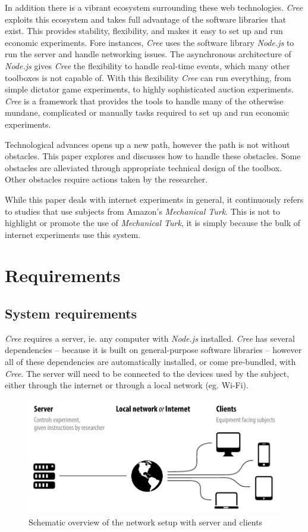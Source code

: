 \documentclass[preprint, 12pt]{elsarticle}
\newcommand{\Cree}{\emph{Cree}\xspace}
\begin{document}
In addition there is a vibrant ecosystem surrounding these web technologies. \Cree exploits this ecosystem and takes full advantage of the software libraries that exist. This provides stability, flexibility, and makes it easy to set up and run economic experiments. Fore instances, \Cree uses the software library \emph{Node.js} to run the server and handle networking issues. The asynchronous architecture of \emph{Node.js} gives \Cree the flexibility to handle real-time events, which many other toolboxes is not capable of. With this flexibility \Cree can run everything, from simple dictator game experiments, to highly sophisticated auction experiments. \Cree is a framework that provides the tools to handle many of the otherwise mundane, complicated or manually tasks required to set up and run economic experiments.

Technological advances opens up a new path, however the path is not without obstacles. This paper explores and discusses how to handle these obstacles. Some obstacles are alleviated through appropriate technical design of the toolbox. Other obstacles require actions taken by the researcher.

While this paper deals with internet experiments in general, it continuously refers to studies that use subjects from Amazon's \emph{Mechanical Turk}. This is not to highlight or promote the use of \emph{Mechanical Turk}, it is simply because the bulk of internet experiments use this system.

\section{Requirements}
\label{S:Requirements}

\subsection{System requirements}

\Cree requires a server, ie. any computer with \emph{Node.js} installed. \Cree has several dependencies -- because it is built on general-purpose software libraries -- however all of these dependencies are automatically installed, or come pre-bundled, with \Cree. The server will need to be connected to the devices used by the subject, either through the internet or through a local network (eg. Wi-Fi). 

\begin{figure}[h!]
  \caption{Schematic overview of the network setup with server and clients}
  \centering
    \includegraphics[width=\textwidth]{figures/setup}
\end{figure}
\end{document}

